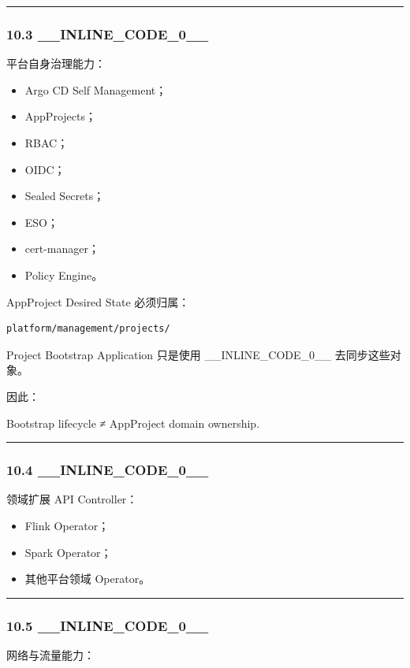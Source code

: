 \documentclass[11pt,a4paper]{article}
\begin{document}
\vspace{0.5em}\hrule\vspace{0.5em}
\subsubsection{10.3 \_\_INLINE\_CODE\_0\_\_}
平台自身治理能力：

\begin{itemize}
  \item Argo CD Self Management；
  \item AppProjects；
  \item RBAC；
  \item OIDC；
  \item Sealed Secrets；
  \item ESO；
  \item cert-manager；
  \item Policy Engine。
\end{itemize}
AppProject Desired State 必须归属：

\begin{lstlisting}[language=text]
platform/management/projects/
\end{lstlisting}
Project Bootstrap Application 只是使用 \_\_INLINE\_CODE\_0\_\_ 去同步这些对象。

因此：

\begin{gfmBlockquote}
Bootstrap lifecycle ≠ AppProject domain ownership.
\end{gfmBlockquote}
\vspace{0.5em}\hrule\vspace{0.5em}
\subsubsection{10.4 \_\_INLINE\_CODE\_0\_\_}
领域扩展 API Controller：

\begin{itemize}
  \item Flink Operator；
  \item Spark Operator；
  \item 其他平台领域 Operator。
\end{itemize}
\vspace{0.5em}\hrule\vspace{0.5em}
\subsubsection{10.5 \_\_INLINE\_CODE\_0\_\_}
网络与流量能力：
\end{document}
